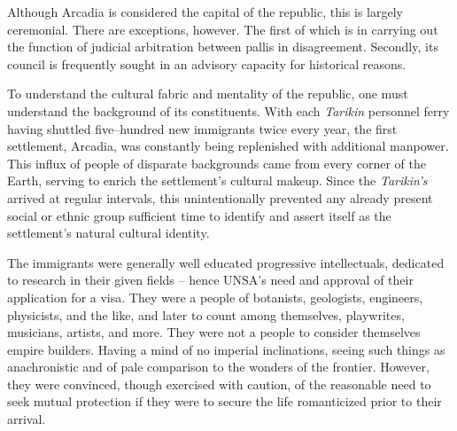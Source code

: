 Although Arcadia is considered the capital of the republic, this is largely ceremonial. There are exceptions, however. The first of which is in carrying out the function of judicial arbitration between pallis in disagreement. Secondly, its council is frequently sought in an advisory capacity for historical reasons.

To understand the cultural fabric and mentality of the republic, one must understand the background of its constituents. With each {\it Tarikin} personnel ferry having shuttled five--hundred new immigrants twice every year, the first settlement, Arcadia, was constantly being replenished with additional manpower. This influx of people of disparate backgrounds came from every corner of the Earth, serving to enrich the settlement's cultural makeup. Since the {\it Tarikin's} arrived at regular intervals, this unintentionally prevented any already present social or ethnic group sufficient time to identify and assert itself as the settlement's natural cultural identity.

The immigrants were generally well educated progressive intellectuals, dedicated to research in their given fields -- hence UNSA's need and approval of their application for a visa. They were a people of botanists, geologists, engineers, physicists, and the like, and later to count among themselves, playwrites, musicians, artists, and more. They were not a people to consider themselves empire builders. Having a mind of no imperial inclinations, seeing such things as anachronistic and of pale comparison to the wonders of the frontier. However, they were convinced, though exercised with caution, of the reasonable need to seek mutual protection if they were to secure the life romanticized prior to their arrival.

